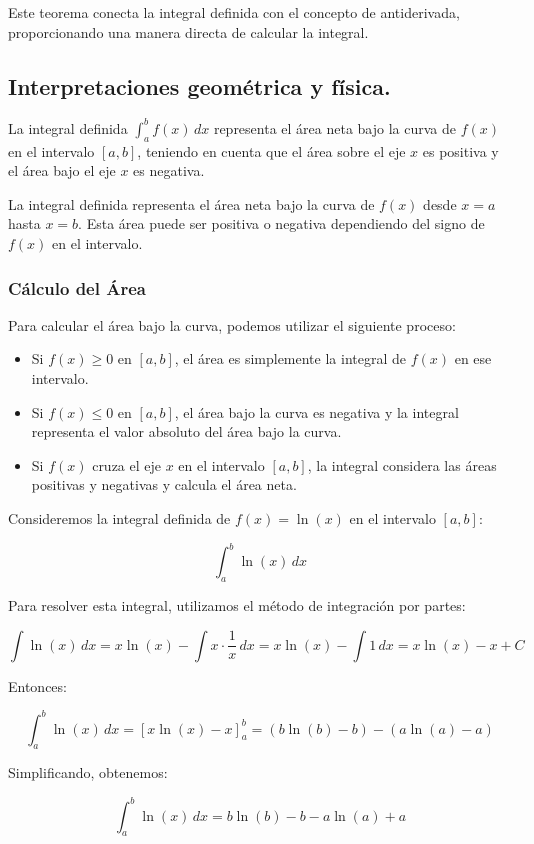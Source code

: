 Este teorema conecta la integral definida con el concepto de antiderivada, proporcionando una manera directa de calcular la integral.





\subsection{Interpretaciones geométrica y física.}
La integral definida \(\int_{a}^{b} f(x) \, dx\) representa el área neta bajo la curva de \( f(x) \) en el intervalo \([a, b]\), teniendo en cuenta que el área sobre el eje \( x \) es positiva y el área bajo el eje \( x \) es negativa.

La integral definida representa el área neta bajo la curva de \( f(x) \) desde \( x = a \) hasta \( x = b \). Esta área puede ser positiva o negativa dependiendo del signo de \( f(x) \) en el intervalo. 

\subsubsection{Cálculo del Área}

Para calcular el área bajo la curva, podemos utilizar el siguiente proceso:

\begin{itemize}
    \item Si \( f(x) \geq 0 \) en \([a, b]\), el área es simplemente la integral de \( f(x) \) en ese intervalo.
    \item Si \( f(x) \leq 0 \) en \([a, b]\), el área bajo la curva es negativa y la integral representa el valor absoluto del área bajo la curva.
    \item Si \( f(x) \) cruza el eje \( x \) en el intervalo \([a, b]\), la integral considera las áreas positivas y negativas y calcula el área neta.
\end{itemize}

\begin{example}
    Consideremos la integral definida de \( f(x) = \ln(x) \) en el intervalo \([a, b]\):

\[
\int_{a}^{b} \ln(x) \, dx
\]

Para resolver esta integral, utilizamos el método de integración por partes:

\[
\int \ln(x) \, dx = x \ln(x) - \int x \cdot \frac{1}{x} \, dx = x \ln(x) - \int 1 \, dx = x \ln(x) - x + C
\]

Entonces:

\[
\int_{a}^{b} \ln(x) \, dx = \left[ x \ln(x) - x \right]_{a}^{b} = \left( b \ln(b) - b \right) - \left( a \ln(a) - a \right)
\]

Simplificando, obtenemos:

\[
\int_{a}^{b} \ln(x) \, dx = b \ln(b) - b - a \ln(a) + a
\]
\end{example}

